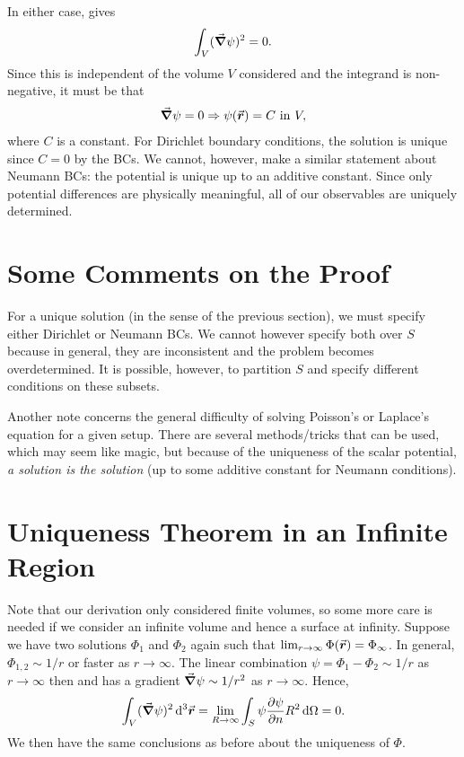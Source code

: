 In either case,  gives
\begin{eqnarray}
    \int_{V} (\grad \psi)^2 = 0
.\end{eqnarray}
Since this is independent of the volume $V$ considered and the integrand is non-negative, it must be that 
\begin{eqnarray}
    \grad \psi = 0 \Rightarrow \psi(\va*{r}) = C ~{\rm in}~V
,\end{eqnarray}
where $C$ is a constant.
For Dirichlet boundary conditions, the solution is unique since $C = 0$ by the BCs.
We cannot, however, make a similar statement about Neumann BCs: the potential is unique up to an additive constant.
Since only potential differences are physically meaningful, all of our observables are uniquely determined.

\section{Some Comments on the Proof}

For a unique solution (in the sense of the previous section), we must specify either Dirichlet or Neumann BCs.
We cannot however specify both over $S$ because in general, they are inconsistent and the problem becomes overdetermined.
It is possible, however, to partition $S$ and specify different conditions on these subsets.

Another note concerns the general difficulty of solving Poisson's or Laplace's equation for a given setup.
There are several methods/tricks that can be used, which may seem like magic, but because of the uniqueness of the scalar potential, \textit{a solution is the solution} (up to some additive constant for Neumann conditions).

\section{Uniqueness Theorem in an Infinite Region}

Note that our derivation only considered finite volumes, so some more care is needed if we consider an infinite volume and hence a surface at infinity.
Suppose we have two solutions $\Phi_1$ and $\Phi_2$ again such that $\lim_{r \rightarrow \infty} \Phi(\va*{r}) = \Phi_{\infty}$.
In general, $\Phi_{1,2} \sim 1/r$ or faster as $r \rightarrow \infty$.
The linear combination $\psi = \Phi_1 - \Phi_2 \sim 1/r$ as $r \rightarrow \infty$ then and has a gradient $\grad \psi \sim 1/r^2$ as $r \rightarrow \infty$.
Hence,
\begin{eqnarray}
    \int_{V} (\grad \psi)^2 \dd[3]{\va*{r}} = \lim_{R \rightarrow \infty} \int_{S} \psi \pdv{\psi}{n} R^2 \dd{\Omega} = 0
.\end{eqnarray}
We then have the same conclusions as before about the uniqueness of $\Phi$.

